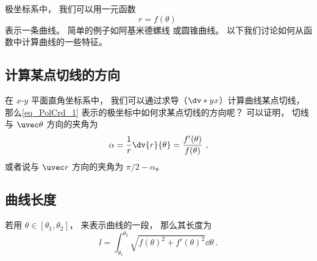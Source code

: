 
\begin{issues}
\issueDraft
\end{issues}


极坐标系中， 我们可以用一元函数
\begin{equation}\label{eq_PolCrd_1}
r = f(\theta)~
\end{equation}
表示一条曲线。 简单的例子如阿基米德螺线 或圆锥曲线。 以下我们讨论如何从函数中计算曲线的一些特征。

\subsection{计算某点切线的方向}


在 $x$-$y$ 平面直角坐标系中， 我们可以通过求导（$\dv*{y}{x}$）计算曲线某点切线， 那么\autoref{eq_PolCrd_1} 表示的极坐标中如何求某点切线的方向呢？ 可以证明， 切线与 $\uvec\theta$ 方向的夹角为
\begin{equation}
\alpha = \frac{1}{r} \dv{r}{\theta} = \frac{f'(\theta)}{f(\theta)}~,
\end{equation}
或者说与 $\uvec r$ 方向的夹角为 $\pi/2 - \alpha$。


\subsection{曲线长度}

若用 $\theta \in [\theta_1, \theta_2]$， 来表示曲线的一段， 那么其长度为
\begin{equation}
l = \int_{\theta_1}^{\theta_2} \sqrt{f(\theta)^2 + f'(\theta)^2} \dd{\theta}~.
\end{equation}

